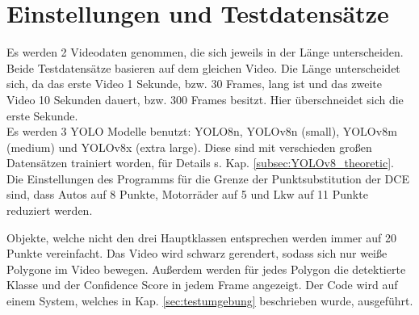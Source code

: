 \section{Einstellungen und Testdatensätze}
{
	Es werden 2 Videodaten genommen, die sich jeweils in der Länge unterscheiden. Beide Testdatensätze basieren auf dem gleichen Video. Die Länge unterscheidet sich, da das erste Video 1 Sekunde, bzw. 30 Frames, lang ist und das zweite Video 10 Sekunden dauert, bzw. 300 Frames besitzt. Hier überschneidet sich die erste Sekunde. \\
	Es werden 3 YOLO Modelle benutzt: YOLO8n, YOLOv8n (small), YOLOv8m (medium) und YOLOv8x (extra large). Diese sind mit verschieden großen Datensätzen trainiert worden, für Details s. Kap. \ref{subsec:YOLOv8_theoretic}.
	Die Einstellungen des Programms für die Grenze der Punktsubstitution der DCE sind, dass Autos auf 8 Punkte, Motorräder auf 5 und Lkw auf 11 Punkte reduziert werden.

	Objekte, welche nicht den drei Hauptklassen entsprechen werden immer auf 20 Punkte vereinfacht. Das Video wird  schwarz gerendert, sodass sich nur weiße Polygone im Video bewegen. Außerdem werden für jedes Polygon die detektierte Klasse und der Confidence Score in jedem Frame angezeigt.
	Der Code wird auf einem System, welches in Kap. \ref{sec:testumgebung} beschrieben wurde, ausgeführt.

}

